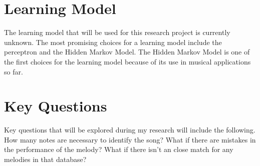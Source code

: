 \documentclass{article}
\begin{document}
	\section{Learning Model}
	The learning model that will be used for this research project is currently unknown. The most promising choices for a learning model include the perceptron and the Hidden Markov Model. The Hidden Markov Model is one of the first choices for the learning model because of its use in musical applications so far.
	
	\section{Key Questions}
	Key questions that will be explored during my research will include the following. How many notes are necessary to identify the song? What if there are mistakes in the performance of the melody? What if there isn't an close match for any melodies in that database?
	
\end{document}
